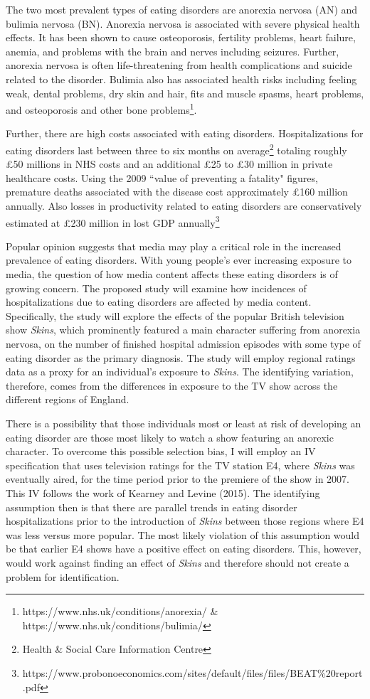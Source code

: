 \documentclass[12pt]{article}
\begin{document}
The two most prevalent types of eating disorders are anorexia nervosa (AN) and bulimia nervosa (BN). Anorexia nervosa is associated with severe physical health effects. It has been shown to cause osteoporosis, fertility problems, heart failure, anemia, and problems with the brain and nerves including seizures. Further, anorexia nervosa is often life-threatening from health complications and suicide related to the disorder. Bulimia also has associated health risks including feeling weak, dental problems, dry skin and hair, fits and muscle spasms, heart problems, and osteoporosis and other bone problems\footnote{https://www.nhs.uk/conditions/anorexia/ \& https://www.nhs.uk/conditions/bulimia/}.

Further, there are high costs associated with eating disorders. Hospitalizations for eating disorders last between three to six months on average\footnote{Health \& Social Care Information Centre} totaling roughly \pounds50 millions in NHS costs and an additional \pounds25 to \pounds30 million in private healthcare costs. Using the 2009 ``value of preventing a fatality" figures, premature deaths associated with the disease cost approximately \pounds160 million annually. Also losses in productivity related to eating disorders are conservatively estimated at \pounds230 million in lost GDP annually\footnote{https://www.probonoeconomics.com/sites/default/files/files/BEAT\%20report.pdf}

Popular opinion suggests that media may play a critical role in the increased prevalence of eating disorders. With young people's ever increasing exposure to media, the question of how media content affects these eating disorders is of growing concern. The proposed study will examine how incidences of hospitalizations due to eating disorders are affected by media content. Specifically, the study will explore the effects of the popular British television show \textit{Skins}, which prominently featured a main character suffering from anorexia nervosa, on the number of finished hospital admission episodes with some type of eating disorder as the primary diagnosis. The study will employ regional ratings data as a proxy for an individual's exposure to \textit{Skins}. The identifying variation, therefore, comes from the differences in exposure to the TV show across the different regions of England. 

There is a possibility that those individuals most or least at risk of developing an eating disorder are those most likely to watch a show featuring an anorexic character. To overcome this possible selection bias, I will employ an IV specification that uses television ratings for the TV station E4, where \textit{Skins} was eventually aired, for the time period prior to the premiere of the show in 2007. This IV follows the work of Kearney and Levine (2015). The identifying assumption then is that there are parallel trends in eating disorder hospitalizations prior to the introduction of \textit{Skins} between those regions where E4 was less versus more popular. The most likely violation of this assumption would be that earlier E4 shows have a positive effect on eating disorders. This, however, would work against finding an effect of \textit{Skins} and therefore should not create a problem for identification.
\end{document}
